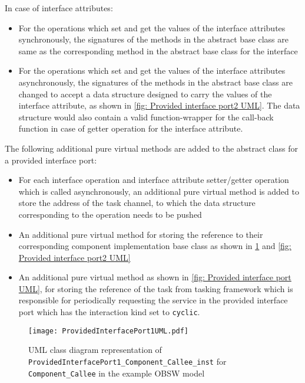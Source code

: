 In case of interface attributes:
\begin{itemize}
\item For the operations which set and get the values of the interface attributes synchronously, the signatures of the methods in the abstract base class are same as the corresponding method in the abstract base class for the interface
\item For the operations which set and get the values of the interface attributes asynchronously, the signatures of the methods in the abstract base class are changed to accept a data structure designed to carry the values of the interface attribute, as shown in \cref{fig: Provided interface port2 UML}. The data structure would also contain a valid function-wrapper for the call-back function in case of getter operation for the interface attribute.  
\end{itemize}

The following additional pure virtual methods are added to the abstract class for a provided interface port:
\begin{itemize}
\item For each interface operation and interface attribute setter/getter operation which is called asynchronously, an additional pure virtual method is added to store the address of the task channel, to which the data structure corresponding to the operation needs to be pushed
\item An additional pure virtual method for storing the reference to their corresponding component implementation base class as shown in \cref{fig: Provided interface port1 UML} and \cref{fig: Provided interface port2 UML}
\item An additional pure virtual method as shown in \cref{fig: Provided interface port UML}, for storing the reference of the task from tasking framework which is responsible for periodically requesting the service in the provided interface port which has the interaction kind set to \texttt{cyclic}. 
\end{itemize}

\begin{figure}[h]
	\centering
	\texttt{[image: ProvidedInterfacePort1UML.pdf]}
	\caption{UML class diagram representation of \texttt{Provided\allowbreak Interface\allowbreak Port1\allowbreak\_Component\allowbreak\_Callee\allowbreak\_inst} for \texttt{Component\allowbreak\_Callee} in the example OBSW model}
	\label{fig: Provided interface port1 UML}
\end{figure}

